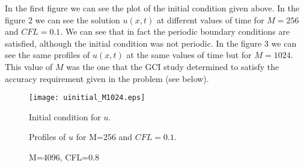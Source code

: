 In the first figure we can see the plot of the initial condition given above. In the figure 2 we can see the solution $u(x,t)$ at different values of time for $M=256$ and $CFL=0.1$. We can see that in fact the periodic boundary conditions are satisfied, although the initial condition was not periodic. In the figure 3 we can see the same profiles of $u(x,t)$ at the same values of time but for $M=1024$. This value of $M$ was the one that the GCI study determined to satisfy the accuracy requirement given in the problem (see below). 
\begin{figure}[H]
\centering     %
\texttt{[image: uinitial\_M1024.eps]}\caption{Initial condition for $u$.}
\end{figure}

\begin{figure}[H]
\centering     %
\hspace*{\fill}
\hfill
{}
\hspace*{\fill}

\hspace*{\fill}
\hfill
{}
\hspace*{\fill}

\caption{Profiles of $u$ for M=256 and $CFL=0.1$.}
\end{figure}

\begin{figure}[H]
\centering     %
\hspace*{\fill}
\hfill
{}
\hspace*{\fill}

\hspace*{\fill}
\hfill
{}
\hspace*{\fill}

\caption{M=4096, CFL=0.8}
\end{figure}


